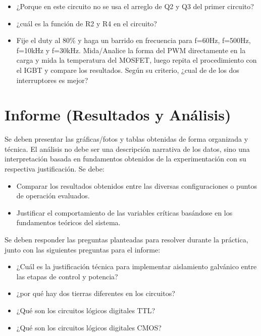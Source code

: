 \documentclass[12pt]{article}
\begin{document}
\begin{itemize}
    \item ¿Porque en este circuito no se usa el arreglo de Q2 y Q3 del primer circuito?
    \item ¿cuál es la función de R2 y R4 en el circuito?
    \item Fije el duty al 80\% y haga un barrido en frecuencia para f=60Hz, f=500Hz, f=10kHz y f=30kHz. Mida/Analice la forma del PWM directamente en la carga y mida la temperatura del MOSFET, luego repita el procedimiento con el IGBT y compare los resultados. Según su criterio, ¿cual de de los dos interruptores es mejor?
\end{itemize}




\section{Informe (Resultados y Análisis)}
Se deben presentar las gráficas/fotos y tablas obtenidas de forma organizada y técnica. El análisis no debe ser una descripción narrativa de los datos, sino una interpretación basada en fundamentos obtenidos de la experimentación con su respectiva justificación. Se debe:

\begin{itemize}
    \item Comparar los resultados obtenidos entre las diversas configuraciones o puntos de operación evaluados.
    \item Justificar el comportamiento de las variables críticas basándose en los fundamentos teóricos del sistema.
\end{itemize}

Se deben responder las preguntas planteadas para resolver durante la práctica, junto con las siguientes preguntas para el informe:

\begin{itemize}
    \item ¿Cuál es la justificación técnica para implementar aislamiento galvánico entre las etapas de control y potencia?
    \item ¿por qué hay dos tierras diferentes en los circuitos?
    \item ¿Qué son los circuitos lógicos digitales TTL?
    \item ¿Qué son los circuitos lógicos digitales CMOS?
\end{itemize}
\end{document}
